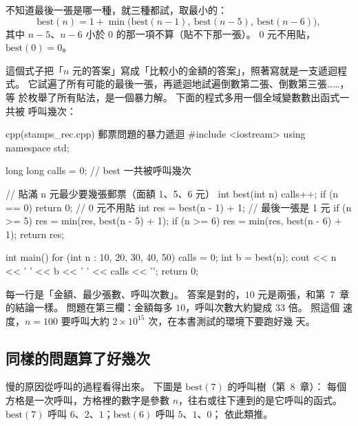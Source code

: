 不知道最後一張是哪一種，就三種都試，取最小的：
\[
\mathrm{best}(n) = 1 + \min\bigl(\mathrm{best}(n - 1),\ \mathrm{best}(n - 5),\
\mathrm{best}(n - 6)\bigr),
\]
其中 $n - 5$、$n - 6$ 小於 $0$ 的那一項不算（貼不下那一張）。 $0$ 元不用貼，
$\mathrm{best}(0) = 0$。

這個式子把「$n$ 元的答案」寫成「比較小的金額的答案」，照著寫就是一支遞迴程
式。 它試遍了所有可能的最後一張，再遞迴地試遍倒數第二張、倒數第三張……，等
於枚舉了所有貼法，是一個暴力解。 下面的程式多用一個全域變數數出函式一共被
呼叫幾次：

\begin{example}[label=ex:stamps-rec]{cpp}{(stamps\_rec.cpp) 郵票問題的暴力遞迴}
#include <iostream>
using namespace std;

long long calls = 0;   // best 一共被呼叫幾次

// 貼滿 n 元最少要幾張郵票（面額 1、5、6 元）
int best(int n) {
    calls++;
    if (n == 0) {
        return 0;                     // 0 元不用貼
    }
    int res = best(n - 1) + 1;        // 最後一張是 1 元
    if (n >= 5) {
        res = min(res, best(n - 5) + 1);
    }
    if (n >= 6) {
        res = min(res, best(n - 6) + 1);
    }
    return res;
}

int main() {
    for (int n : {10, 20, 30, 40, 50}) {
        calls = 0;
        int b = best(n);
        cout << n << ' ' << b << ' ' << calls << '\n';
    }
    return 0;
}
\end{example}


每一行是「金額、最少張數、呼叫次數」。 答案是對的，$10$ 元是兩張，和第~7~章
的結論一樣。 問題在第三欄：金額每多 $10$，呼叫次數大約變成 $33$ 倍。 照這個
速度，$n = 100$ 要呼叫大約 $2 \times 10^{15}$ 次，在本書測試的環境下要跑好幾
天。

\subsection{同樣的問題算了好幾次}

慢的原因從呼叫的過程看得出來。 下圖是 $\mathrm{best}(7)$ 的呼叫樹（第~8~章）：
每個方格是一次呼叫，方格裡的數字是參數 $n$，往右或往下連到的是它呼叫的函式。
$\mathrm{best}(7)$ 呼叫 $6$、$2$、$1$；$\mathrm{best}(6)$ 呼叫 $5$、$1$、$0$；
依此類推。

